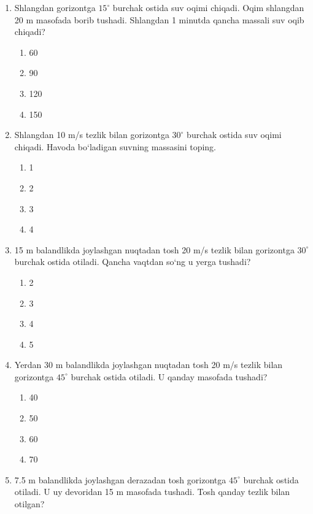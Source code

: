 \begin{enumerate}
\item Shlangdan gorizontga $15^\circ$ burchak ostida suv oqimi chiqadi. Oqim shlangdan 20 m masofada borib tushadi. Shlangdan 1 minutda qancha massali suv oqib chiqadi?

\begin{enumerate}[label=\Alph*)]
\item 60
\item 90
\item 120
\item 150
\end{enumerate}

\item Shlangdan 10 m/s tezlik bilan gorizontga $30^\circ$ burchak ostida suv oqimi chiqadi. Havoda bo‘ladigan suvning massasini toping.

\begin{enumerate}[label=\Alph*)]
\item 1
\item 2
\item 3
\item 4
\end{enumerate}

\item 15 m balandlikda joylashgan nuqtadan tosh 20 m/s tezlik bilan gorizontga $30^\circ$ burchak ostida otiladi. Qancha vaqtdan so‘ng u yerga tushadi?

\begin{enumerate}[label=\Alph*)]
\item 2
\item 3
\item 4
\item 5
\end{enumerate}

\item Yerdan 30 m balandlikda joylashgan nuqtadan tosh 20 m/s tezlik bilan gorizontga $45^\circ$ burchak ostida otiladi. U qanday masofada tushadi?

\begin{enumerate}[label=\Alph*)]
\item 40
\item 50
\item 60
\item 70
\end{enumerate}

\item 7.5 m balandlikda joylashgan derazadan tosh gorizontga $45^\circ$ burchak ostida otiladi. U uy devoridan 15 m masofada tushadi. Tosh qanday tezlik bilan otilgan?


\end{enumerate}

